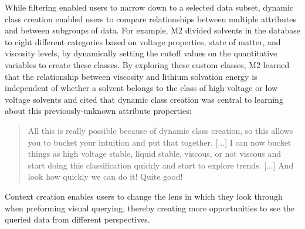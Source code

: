 \par While filtering enabled users to narrow down to a selected data subset, dynamic class creation enabled users to compare relationships between multiple attributes and between subgroups of data. For example, M2 divided solvents in the database to eight different categories based on voltage properties, state of matter, and viscosity levels, by dynamically setting the cutoff values on the quantitative variables to create these classes. By exploring these custom classes, M2 learned that the relationship between viscosity and lithium solvation energy is independent of whether a solvent belongs to the class of high voltage or low voltage solvents and cited that dynamic class creation was central to learning about this previously-unknown attribute properties:
\begin{quote}
All this is really possible because of dynamic class creation, so this allows you to bucket your intuition and put that together. [...] I can now bucket things as high voltage stable, liquid stable, viscous, or not viscous and start doing this classification quickly and start to explore trends. [...] And look how quickly we can do it! Quite good!
\end{quote}
Context creation enables users to change the lens in which they look through when preforming visual querying, thereby creating more opportunities to see the queried data from different perspectives.
